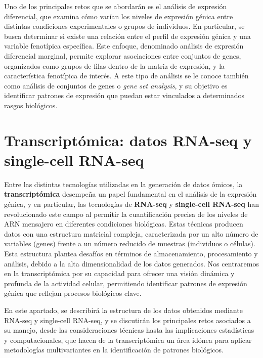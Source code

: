 Uno de los principales retos que se abordarán es el análisis de expresión diferencial, 
que examina cómo varían los niveles de expresión génica entre distintas condiciones experimentales o grupos de individuos. En particular, se
busca determinar si existe una relación entre el perfil de expresión génica y una variable fenotípica específica. Este enfoque, denominado análisis
de expresión diferencial marginal, permite explorar asociaciones entre conjuntos de genes, organizados como grupos de filas dentro de la matriz de expresión, 
y la característica fenotípica de interés. A este tipo de análisis se le conoce también como análisis de conjuntos de genes o \textit{gene set analysis}, y 
su objetivo es identificar patrones de expresión que puedan estar vinculados a determinados rasgos biológicos.



\section{Transcriptómica: datos RNA-seq y single-cell RNA-seq}

Entre las distintas tecnologías utilizadas en la generación de datos ómicos, la \textbf{transcriptómica} desempeña un papel fundamental en el análisis de la expresión génica, y en particular, las 
tecnologías de \textbf{RNA-seq} y \textbf{single-cell RNA-seq} han revolucionado este campo al permitir la cuantificación precisa de los 
niveles de ARN mensajero en diferentes condiciones biológicas. Estas técnicas producen datos con una estructura matricial 
compleja, caracterizada por un alto número de variables (genes) frente a un número reducido de muestras (individuos o células). 
Esta estructura plantea desafíos en términos de almacenamiento, procesamiento y análisis, debido a la alta dimensionalidad de 
los datos generados. Nos centraremos en la transcriptómica por su capacidad para ofrecer una visión dinámica 
y profunda de la actividad celular, permitiendo identificar patrones de expresión génica que reflejan procesos biológicos clave. \newline

En este apartado, se describirá la estructura de los datos obtenidos mediante RNA-seq y single-cell RNA-seq, y se discutirán los 
principales retos asociados a su manejo, desde las consideraciones técnicas hasta las implicaciones estadísticas y computacionales, 
que hacen de la transcriptómica un área idónea para aplicar metodologías multivariantes en la identificación de patrones biológicos.

